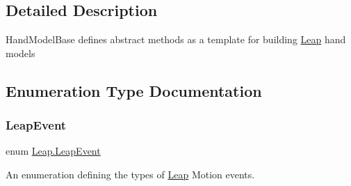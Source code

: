\subsection{Detailed Description}
Hand\+Model\+Base defines abstract methods as a template for building \mbox{\hyperlink{namespace_leap}{Leap}} hand models 

\subsection{Enumeration Type Documentation}
\mbox{\label{namespace_leap_a5b8c8df3b9ace307e29863779a4ae85d}} 
\subsubsection{\texorpdfstring{LeapEvent}{LeapEvent}}
{\footnotesize\ttfamily enum \mbox{\hyperlink{namespace_leap_a5b8c8df3b9ace307e29863779a4ae85d}{Leap.\+Leap\+Event}}\hspace{0.3cm}{\ttfamily [strong]}}



An enumeration defining the types of \mbox{\hyperlink{namespace_leap}{Leap}} Motion events. 

